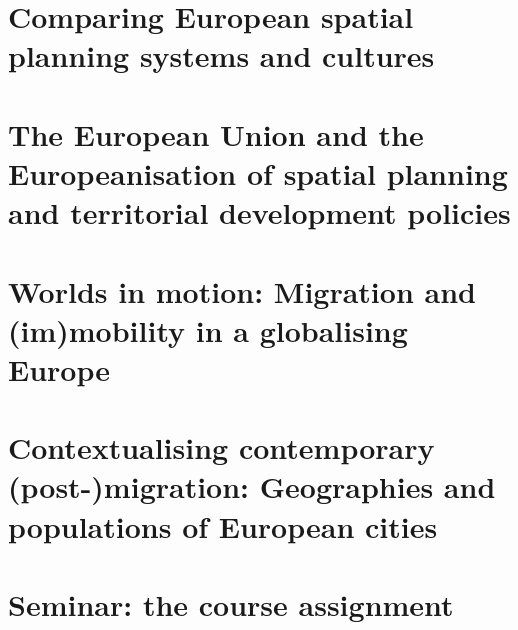 \documentclass{article}
\begin{document}

\section{Comparing European spatial planning systems and cultures}
\date{November 8th, 2021}



\section{The European Union and the Europeanisation of spatial planning and territorial development policies}
\date{November 9th, 2021}


\section{Worlds in motion: Migration and (im)mobility in a globalising Europe}
\date{November 22nd, 2021}


\section{Contextualising contemporary (post-)migration: Geographies and populations of European cities}
\date{November 29th, 2021}


\section{Seminar: the course assignment}
\date{October 11th, 2021}

\end{document}
